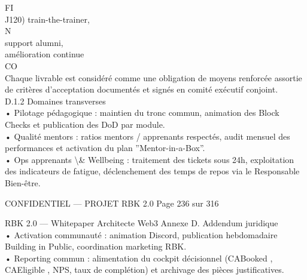 FI\\
J120)                 train-the-trainer,\\
\vspace{0.5em}
\vspace{0.5em}
\vspace{0.5em}
N\\
support alumni,\\
amélioration continue\\
CO\\
Chaque livrable est considéré comme une obligation de moyens renforcée assortie de critères d’acceptation documentés et signés en comité exécutif conjoint.\\
\vspace{0.5em}
\vspace{0.5em}
D.1.2 Domaines transverses\\
• Pilotage pédagogique : maintien du tronc commun, animation des Block Checks et publication des DoD par module.\\
\vspace{0.5em}
• Qualité mentors : ratios mentors / apprenants respectés, audit mensuel des performances et activation du plan ”Mentor-in-a-Box”.\\
\vspace{0.5em}
• Ops apprenants \textbackslash{}& Wellbeing : traitement des tickets sous 24h, exploitation des indicateurs de fatigue, déclenchement des temps de repos via le Responsable\\
Bien-être.\\
\vspace{0.5em}
\vspace{0.5em}
\vspace{0.5em}
\vspace{0.5em}
\begin{confidential}CONFIDENTIEL — PROJET RBK 2.0                                            Page 236 sur 316\end{confidential}
RBK 2.0 — Whitepaper Architecte Web3                                                                                                 Annexe D. Addendum juridique\\
\vspace{0.5em}
\vspace{0.5em}
• Activation communauté : animation Discord, publication hebdomadaire Building in Public, coordination marketing RBK.\\
\vspace{0.5em}
• Reporting commun : alimentation du cockpit décisionnel (CABooked , CAEligible , NPS, taux de complétion) et archivage des pièces justificatives.\\
